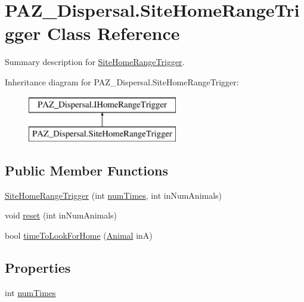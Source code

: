 \hypertarget{class_p_a_z___dispersal_1_1_site_home_range_trigger}{\section{P\-A\-Z\-\_\-\-Dispersal.\-Site\-Home\-Range\-Trigger Class Reference}
\label{class_p_a_z___dispersal_1_1_site_home_range_trigger}
}


Summary description for \hyperlink{class_p_a_z___dispersal_1_1_site_home_range_trigger}{Site\-Home\-Range\-Trigger}.  


Inheritance diagram for P\-A\-Z\-\_\-\-Dispersal.\-Site\-Home\-Range\-Trigger\-:\begin{figure}[H]
\begin{center}
\leavevmode
\includegraphics[height=2.000000cm]{class_p_a_z___dispersal_1_1_site_home_range_trigger}
\end{center}
\end{figure}
\subsection*{Public Member Functions}
\begin{DoxyCompactItemize}
\item 
\hyperlink{class_p_a_z___dispersal_1_1_site_home_range_trigger_aef56aa04f2e2781ef3c77079dd45d100}{Site\-Home\-Range\-Trigger} (int \hyperlink{class_p_a_z___dispersal_1_1_site_home_range_trigger_a5e93f5c307522d18840850593c4023c0}{num\-Times}, int in\-Num\-Animals)
\item 
void \hyperlink{class_p_a_z___dispersal_1_1_site_home_range_trigger_a0f6fe89148339e3d5c7f5517cbe8e1ef}{reset} (int in\-Num\-Animals)
\item 
bool \hyperlink{class_p_a_z___dispersal_1_1_site_home_range_trigger_a2f845a04b26c14a8697f53aa4be2553c}{time\-To\-Look\-For\-Home} (\hyperlink{class_p_a_z___dispersal_1_1_animal}{Animal} in\-A)
\end{DoxyCompactItemize}
\subsection*{Properties}
\begin{DoxyCompactItemize}
\item 
int \hyperlink{class_p_a_z___dispersal_1_1_site_home_range_trigger_a5e93f5c307522d18840850593c4023c0}{num\-Times}
\end{DoxyCompactItemize}



